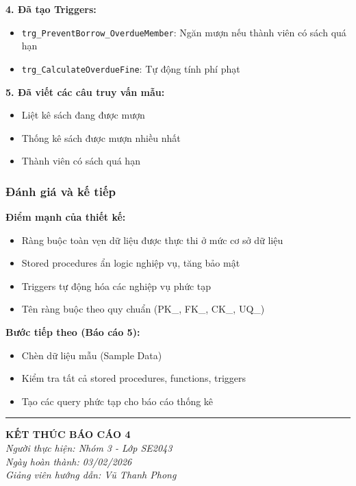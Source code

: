 \documentclass[12pt,a4paper]{article}
\begin{document}
\textbf{4. Đã tạo Triggers:}
\begin{itemize}
    \item \texttt{trg\_PreventBorrow\_OverdueMember}: Ngăn mượn nếu thành viên có sách quá hạn
    \item \texttt{trg\_CalculateOverdueFine}: Tự động tính phí phạt
\end{itemize}

\textbf{5. Đã viết các câu truy vấn mẫu:}
\begin{itemize}
    \item Liệt kê sách đang được mượn
    \item Thống kê sách được mượn nhiều nhất
    \item Thành viên có sách quá hạn
\end{itemize}

\subsubsection{Đánh giá và kế tiếp}

\textbf{Điểm mạnh của thiết kế:}
\begin{itemize}
    \item Ràng buộc toàn vẹn dữ liệu được thực thi ở mức cơ sở dữ liệu
    \item Stored procedures ẩn logic nghiệp vụ, tăng bảo mật
    \item Triggers tự động hóa các nghiệp vụ phức tạp
    \item Tên ràng buộc theo quy chuẩn (PK\_, FK\_, CK\_, UQ\_)
\end{itemize}

\textbf{Bước tiếp theo (Báo cáo 5):}
\begin{itemize}
    \item Chèn dữ liệu mẫu (Sample Data)
    \item Kiểm tra tất cả stored procedures, functions, triggers
    \item Tạo các query phức tạp cho báo cáo thống kê
\end{itemize}


\vspace{1cm}
\begin{center}
\rule{0.6\textwidth}{0.4pt}

\textbf{KẾT THÚC BÁO CÁO 4}\\
\vspace{0.5cm}
\textit{Người thực hiện: Nhóm 3 - Lớp SE2043}\\
\textit{Ngày hoàn thành: 03/02/2026}\\
\textit{Giảng viên hướng dẫn: Vũ Thanh Phong}
\end{center}
\end{document}
